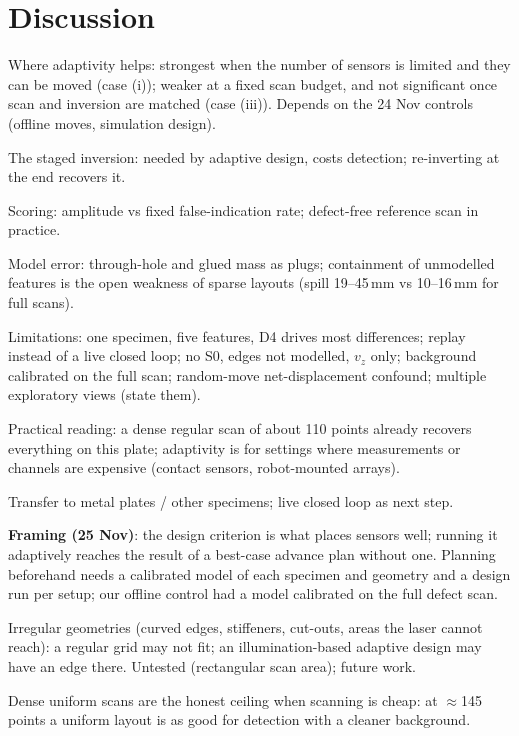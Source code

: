 \section{Discussion}\label{sec:discussion}
\begin{notes}
\item Where adaptivity helps: strongest when the number of sensors is limited and they can be moved (case (i)); weaker at a fixed scan budget, and not significant once scan and inversion are matched (case (iii)). Depends on the 24 Nov controls (offline moves, simulation design).
\item The staged inversion: needed by adaptive design, costs detection; re-inverting at the end recovers it.
\item Scoring: amplitude vs fixed false-indication rate; defect-free reference scan in practice.
\item Model error: through-hole and glued mass as plugs; containment of unmodelled features is the open weakness of sparse layouts (spill 19--45\,mm vs 10--16\,mm for full scans).
\item Limitations: one specimen, five features, D4 drives most differences; replay instead of a live closed loop; no S0, edges not modelled, $v_z$ only; background calibrated on the full scan; random-move net-displacement confound; multiple exploratory views (state them).
\item Practical reading: a dense regular scan of about 110 points already recovers everything on this plate; adaptivity is for settings where measurements or channels are expensive (contact sensors, robot-mounted arrays).
\item Transfer to metal plates / other specimens; live closed loop as next step.
\item \textbf{Framing (25 Nov)}: the design criterion is what places sensors well; running it adaptively reaches the result of a best-case advance plan without one. Planning beforehand needs a calibrated model of each specimen and geometry and a design run per setup; our offline control had a model calibrated on the full defect scan.
\item Irregular geometries (curved edges, stiffeners, cut-outs, areas the laser cannot reach): a regular grid may not fit; an illumination-based adaptive design may have an edge there. Untested (rectangular scan area); future work.
\item Dense uniform scans are the honest ceiling when scanning is cheap: at $\approx$145 points a uniform layout is as good for detection with a cleaner background.
\end{notes}
